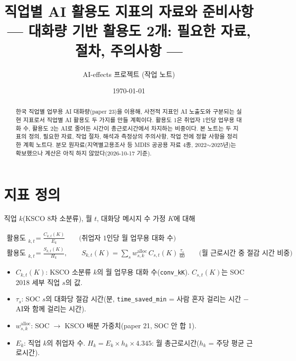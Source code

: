 \documentclass[11pt]{article}
\title{직업별 AI 활용도 지표의 자료와 준비사항\\[2mm]
\large --- 대화량 기반 활용도 2개: 필요한 자료, 절차, 주의사항 ---}
\author{AI-effects 프로젝트 (작업 노트)}
\date{\today}
\begin{document}
\maketitle


\noindent{}


\begin{abstract}
\noindent 한국 직업별 업무용 AI 대화량(paper 23)을 이용해, 사전적 지표인 AI 노출도와 구분되는 실현 지표로서 직업별 AI 활용도 두 가지를 만들 계획이다. 활용도 1은 취업자 1인당 업무용 대화 수, 활용도 2는 AI로 줄어든 시간이 총근로시간에서 차지하는 비중이다. 본 노트는 두 지표의 정의, 필요한 자료, 작업 절차, 해석과 측정상의 주의사항, 작업 전에 정할 사항을 정리한 계획 노트다. 분모 원자료(지역별고용조사 등 MDIS 공공용 자료 4종, 2022$\sim$2025년)는 확보했으나 계산은 아직 하지 않았다(2026-10-17 기준).
\end{abstract}

\tableofcontents

\section{지표 정의}

직업 $k$(KSCO 8차 소분류), 월 $t$, 대화당 메시지 수 가정 $K$에 대해

\begin{align}
\text{활용도1}_{k,t} &= \frac{C_{k,t}(K)}{E_k}
  \qquad \text{(취업자 1인당 월 업무용 대화 수)} \\[1mm]
\text{활용도2}_{k,t} &= \frac{S_{k,t}(K)}{H_k},\qquad
  S_{k,t}(K) = \sum_{s} w^{\text{alloc}}_{s,k}\, C_{s,t}(K)\, \frac{\tau_s}{60}
  \qquad \text{(월 근로시간 중 절감 시간 비중)}
\end{align}

\begin{itemize}[leftmargin=*]
  \item $C_{k,t}(K)$: KSCO 소분류 $k$의 월 업무용 대화 수(\texttt{conv\_kK}). $C_{s,t}(K)$는 SOC 2018 세부 직업 $s$의 값.
  \item $\tau_s$: SOC $s$의 대화당 절감 시간(분, \texttt{time\_saved\_min} = 사람 혼자 걸리는 시간 $-$ AI와 함께 걸리는 시간).
  \item $w^{\text{alloc}}_{s,k}$: SOC $\to$ KSCO 배분 가중치(paper 21, SOC 안 합 1).
  \item $E_k$: 직업 $k$의 취업자 수. $H_k = E_k \times h_k \times 4.345$: 월 총근로시간($h_k$ = 주당 평균 근로시간).
\end{itemize}
\end{document}

